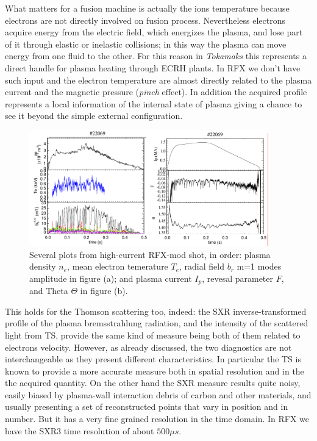 What matters for a fusion machine is actually the ions temperature because electrons are not directly involved on fusion process.
Nevertheless electrons acquire energy from the electric field, which energizes the plasma, and lose part of it through elastic or inelastic collisions; in this way the plasma can move energy from one fluid to the other. For this reason in \textit{Tokamaks} this represents a direct handle for plasma heating through \acs{ECRH} plants. In RFX we don't have such input and the electron temperature are almost directly related to the plasma current and the magnetic pressure (\textit{pinch} effect).
In addition the acquired profile represents a local information of the internal state of plasma giving a chance to see it beyond the simple external configuration.
\begin{figure}
    \centering
    \includegraphics[height=5cm]{img/rfx/shot_example.png}
    \caption{ Several plots from high-current RFX-mod shot, in order: plasma density $n_e$, mean electron temerature $T_e$, radial field $b_r$ m=1 modes amplitude in figure (a); and plasma current $I_p$, revesal parameter $F$, and Theta $\Theta$ in figure (b). }
    \label{fig:rfx_shot_22069}
\end{figure}
This holds for the Thomson scattering too, indeed: the SXR inverse-transformed profile of the plasma bremsstrahlung radiation, and the intensity of the scattered light from TS, provide the same kind of measure being both of them related to electrons velocity.
However, as already discussed, the two diagnostics are not interchangeable as they present different characteristics. In particular the TS is known to provide a more accurate measure both in spatial resolution and in the the acquired quantity. On the other hand the SXR measure results quite noisy, easily biased by plasma-wall interaction debris of carbon and other materials, and usually presenting a set of reconstructed points that vary in position and in number. But it has a very fine grained resolution in the time domain.
In RFX we have the SXR3 time resolution of about $500 \mu s$.
